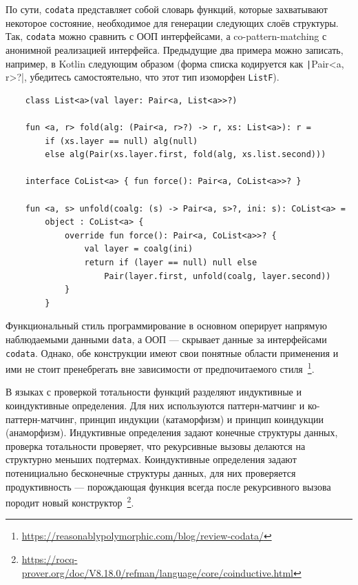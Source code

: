 По сути, \texttt{codata} представляет собой словарь функций, которые захватывают некоторое состояние, необходимое для генерации следующих слоёв структуры.
Так, \texttt{codata} можно сравнить с ООП интерфейсами, а co-pattern-matching с анонимной реализацией интерфейса.
Предыдущие два примера можно записать, например, в Kotlin следующим образом (форма списка кодируется как \texttt|Pair<a, r>?|, убедитесь самостоятельно, что этот тип изоморфен \texttt{ListF}).
\begin{verbatim}
    class List<a>(val layer: Pair<a, List<a>>?)

    fun <a, r> fold(alg: (Pair<a, r>?) -> r, xs: List<a>): r =
        if (xs.layer == null) alg(null)
        else alg(Pair(xs.layer.first, fold(alg, xs.list.second)))

    interface CoList<a> { fun force(): Pair<a, CoList<a>>? }

    fun <a, s> unfold(coalg: (s) -> Pair<a, s>?, ini: s): CoList<a> =
        object : CoList<a> {
            override fun force(): Pair<a, CoList<a>>? {
                val layer = coalg(ini)
                return if (layer == null) null else
                    Pair(layer.first, unfold(coalg, layer.second))
            }
        }
\end{verbatim}

Функциональный стиль программирование в основном оперирует напрямую наблюдаемыми данными \texttt{data}, а ООП --- скрывает данные за интерфейсами \texttt{codata}.
Однако, обе конструкции имеют свои понятные области применения и ими не стоит пренебрегать вне зависимости от предпочитаемого стиля~\cite{downen2019codata}\footnote{\url{https://reasonablypolymorphic.com/blog/review-codata/}}.

В языках с проверкой тотальности функций разделяют индуктивные и коиндуктивные определения.
Для них используются паттерн-матчинг и ко-паттерн-матчинг, принцип индукции (катаморфизм) и принцип коиндукции (анаморфизм).
Индуктивные определения задают конечные структуры данных, проверка тотальности проверяет, что рекурсивные вызовы делаются на структурно меньших подтермах.
Коиндуктивные определения задают потенициально бесконечные структуры данных, для них проверяется продуктивность --- порождающая функция всегда после рекурсивного вызова породит новый конструктор~\footnote{\url{https://rocq-prover.org/doc/V8.18.0/refman/language/core/coinductive.html}}.


